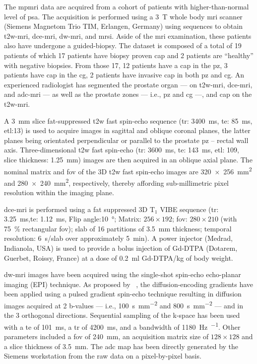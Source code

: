 The \ac{mpmri} data are acquired from a cohort of patients with higher-than-normal level of \ac{psa}.
The acquisition is performed using a \SI{3}{\tesla} whole body \ac{mri} scanner (Siemens Magnetom Trio TIM, Erlangen, Germany) using sequences to obtain \ac{t2w}-\ac{mri}, \ac{dce}-\ac{mri}, \ac{dw}-\ac{mri}, and \ac{mrsi}.
Aside of the \ac{mri} examination, these patients also have undergone a guided-biopsy.
The dataset is composed of a total of 19 patients of which 17 patients have biopsy proven \ac{cap} and 2 patients are ``healthy'' with negative biopsies.
From those 17, 12 patients have a \ac{cap} in the \ac{pz}, 3 patients have \ac{cap} in the \ac{cg}, 2 patients have invasive \ac{cap} in both \ac{pz} and \ac{cg}.
An experienced radiologist has segmented the prostate organ --- on \ac{t2w}-\ac{mri}, \ac{dce}-\ac{mri}, and \ac{adc}-\ac{mri} --- as well as the prostate zones --- i.e., \ac{pz} and \ac{cg} ---, and \ac{cap} on the \ac{t2w}-\ac{mri}.

A \SI{3}{\mm} slice fat-suppressed \ac{t2w} fast spin-echo sequence (\ac{tr}: \SI{3400}{\ms}, \ac{te}: \SI{85}{\ms}, \ac{etl}:13) is used to acquire images in sagittal and oblique coronal planes, the latter planes being orientated perpendicular or parallel to the prostate \ac{pz} – rectal wall axis.
Three-dimensional \ac{t2w} fast spin-echo (\ac{tr}: \SI{3600}{\ms}, \ac{te}: \SI{143}{\ms}, \ac{etl}: 109, slice thickness: \SI{1.25}{\mm}) images are then acquired in an oblique axial plane.
The nominal matrix and \ac{fov} of the 3D \ac{t2w} fast spin-echo images are \SI[product-units=repeat]{320x256}{\milli\metre\squared} and \SI[product-units=repeat]{280x240}{\milli\metre\squared}, respectively, thereby affording sub-millimetric pixel resolution within the imaging plane.

\ac{dce}-\ac{mri} is performed using a fat suppressed 3D T$_1$ VIBE sequence (\ac{tr}: \SI{3.25}{\ms},\ac{te}: \SI{1.12}{\ms}, Flip angle:\SI{10}{\degree}; Matrix: $256 \times 192$; \ac{fov}: $280 \times 210$ (with \SI{75}{\percent} rectangular \ac{fov}); slab of 16 partitions of \SI{3.5}{\mm} thickness; temporal resolution: \SI{6}{\s}/slab over approximately \SI{5}{\minute}).
A power injector (Medrad, Indianola, USA) is used to provide a bolus injection of Gd-DTPA (Dotarem, Guerbet, Roissy, France) at a dose of \SI{0.2}{\ml} Gd-DTPA/kg of body weight.

\ac{dw}-\ac{mri} images have been acquired using the single-shot spin-echo echo-planar imaging (EPI) technique.
As proposed by \citeauthor{stejskal1965spin}~\cite{stejskal1965spin}, the diffusion-encoding gradients have been applied using a pulsed gradient spin-echo technique resulting in diffusion images acquired at 2 b-values --- i.e., \SI{100}{\second\per\milli\meter\squared} and \SI{800}{\second\per\milli\meter\squared} --- and in the 3 orthogonal directions.
Sequential sampling of the k-space has been used with a \ac{te} of \SI{101}{\ms}, a \ac{tr} of \SI{4200}{\ms}, and a bandwidth of \SI{1180}{\hertz\per\px}.
Other parameters included a \ac{fov} of \SI{240}{\milli\metre}, an acquisition matrix size of $128 \times 128$ and a slice thickness of \SI{3.5}{\milli\metre}.
The \ac{adc} map has been directly generated by the Siemens workstation from the raw data on a pixel-by-pixel basis.

